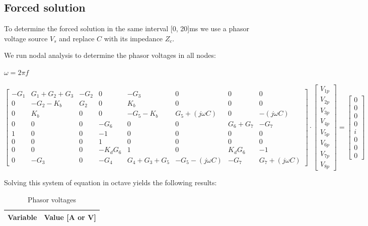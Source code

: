 \subsection{Forced solution}

To determine the forced solution in the same interval [0, 20]ms we use a phasor voltage source $V_s$ and replace $C$ with its impedance $Z_c$.

We run nodal analysis to determine the phasor voltages in all nodes:

 $\omega=2\pi f$
 
\small
  \begin{equation}\label{eq:matrixeq3}
\begin{bmatrix}
-G_1 & G_1+G_2+G_3 & -G_2 & 0 & -G_3 & 0 & 0 & 0\\
0 & -G_2-K_b & G_2 & 0 & K_b & 0 & 0 & 0\\
0 & K_b & 0 & 0 & -G_5-K_b & G_5+(j\omega C) & 0 & -(j\omega C)\\
0 & 0 & 0 & -G_6 & 0 & 0 & G_6+G_7 & -G_7\\
1 & 0 & 0 & -1 & 0 & 0 & 0 & 0\\
0 & 0 & 0 & 1 & 0 & 0 & 0 & 0\\
0 & 0 & 0 & -K_dG_6 & 1 & 0 & K_dG_6 & -1\\
0 & -G_3 & 0 & -G_4 & G_4+G_3+G_5 & -G_5-(j\omega C) & -G_7 & G_7+(j \omega C)
\end{bmatrix}
\cdot
\begin{bmatrix}
V_{1p} \\
V_{2p} \\
V_{3p} \\
V_{4p} \\
V_{5p} \\
V_{6p} \\
V_{7p} \\
V_{8p} 
    \end{bmatrix}
=
    \begin{bmatrix}
0 \\
0 \\
0 \\
0 \\
i \\
0 \\
0 \\
0 
    \end{bmatrix}
  \end{equation}

\small
Solving this system of equation in octave yields the following results:

\begin{table}[H]
    \centering
    \begin{tabular}{|l|r|}
      \hline    
      {\bf Variable} & {\bf Value [A or V]} \\ \hline
      
    \end{tabular}
    \caption{Phasor voltages}
    \label{tab:phasorvoltages}
  \end{table}
  

